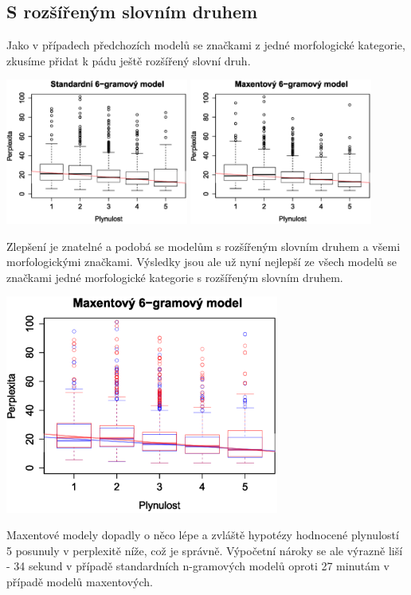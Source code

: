 \documentclass[12pt,a4paper]{report}
\begin{document}
\subsection{S rozšířeným slovním druhem}
Jako v případech předchozích modelů se značkami z jedné morfologické kategorie, zkusíme přidat k pádu ještě rozšířený slovní druh.
\begin{center}
	\includegraphics[width=60mm]{./grafy/morf/ngram/rsd+pad.svg.eps}
	\includegraphics[width=60mm]{./grafy/morf/maxent/rsd+pad.svg.eps}
\end{center}
Zlepšení je znatelné a podobá se modelům s rozšířeným slovním druhem a všemi morfologickými značkami. Výsledky jsou ale už nyní nejlepší ze všech modelů se značkami jedné morfologické kategorie s rozšířeným slovním druhem.
\begin{center}
	\includegraphics[width=90mm]{./grafy/morf/porovnani/rsd+pad.svg.eps}	
\end{center}
Maxentové modely dopadly o něco lépe a zvláště hypotézy hodnocené plynulostí 5 posunuly v perplexitě níže, což je správně. Výpočetní nároky se ale výrazně liší - 34 sekund v případě standardních n-gramových modelů oproti 27 minutám v případě modelů maxentových.
\end{document}
